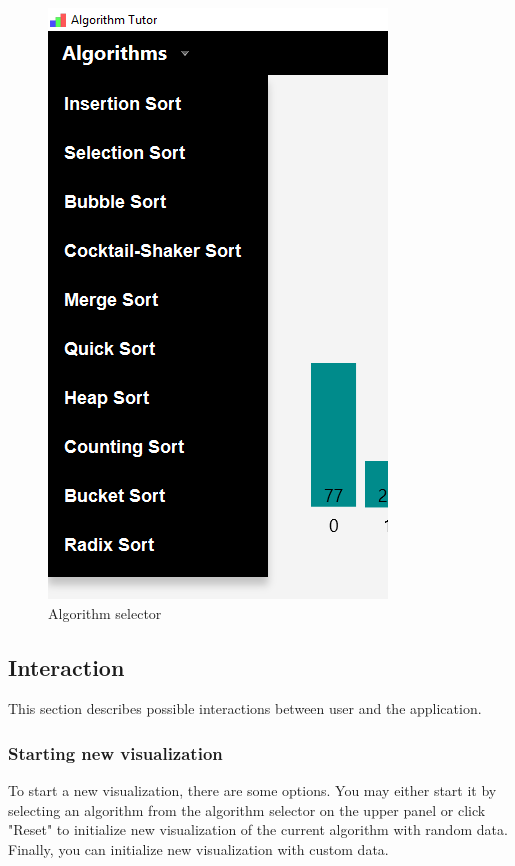 \documentclass[
  field=inf,
  biblatex,
  language=english,
  glossaries,
  theorems=false,
  sourcecodes=false,
  index
]{kidiplom}
\begin{document}
\begin{figure}[H]
\begin{center}
	\includegraphics[scale=0.3]{img/ui/Selector.png}
	\caption{Algorithm selector}\label{fig:selector}
\end{center}
\end{figure}

\subsection{Interaction}

This section describes possible interactions between user and the application.

\subsubsection{Starting new visualization}
To start a new visualization, there are some options. You may either start it by selecting an algorithm from the algorithm selector on the upper panel or click "Reset" to initialize new visualization of the current algorithm with random data. Finally, you can initialize new visualization with custom data.
\end{document}

